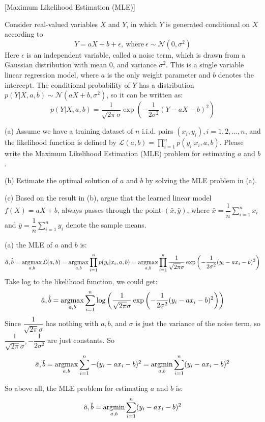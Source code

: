 \item {} [Maximum Likelihood Estimation (MLE)]

Consider real-valued variables $X$ and $Y$, in which $Y$ is generated conditional on $X$ according to
$$Y = aX + b + \epsilon, \ \text{where} \ \epsilon \sim \mathcal{N}(0, \sigma^2)$$
Here $\epsilon$ is an independent variable, called a noise term, which is drawn from a Gaussian distribution with mean 0, and variance $\sigma^2$. This is a single variable linear regression model, where $a$ is the only weight parameter and $b$ denotes the intercept. The conditional probability of $Y$ has a distribution $p(Y | X, a, b) \sim \mathcal{N}(aX+b, \sigma^2)$, so it can be written as:
$$p(Y|X, a,b) = \frac{1}{\sqrt{2\pi}\sigma}\exp\left(-\frac{1}{2\sigma^2}(Y - aX -b)^2\right)$$

(a) Assume we have a training dataset of $n$ i.i.d. pairs $(x_i, y_i), i = 1, 2, \ldots, n$, and the likelihood function is defined by $\mathcal{L}(a,b) = \prod\limits_{i=1}^n p(y_i | x_i, a, b)$. Please write the Maximum Likelihood Estimation (MLE) problem for estimating $a$ and $b$. ~

(b) Estimate the optimal solution of $a$ and $b$ by solving the MLE problem in (a).~

(c) Based on the result in (b), argue that the learned linear model $f(X) = aX + b$, always passes through the point $(\bar{x},\bar{y})$, where $\bar{x} = \dfrac{1}{n}\sum\limits_{i=1}^{n}x_{i}$ and $\bar{y} = \dfrac{1}{n}\sum\limits_{i=1}^{n}y_{i}$ denote the sample means.~

\solution

(a) the MLE of $a$ and $b$ is: \\
$$\hat{a},\hat{b}=\mathop{\rm argmax}\limits_{a,b}\mathcal{L}(a,b)=\mathop{\rm argmax}\limits_{a,b}\prod\limits_{i=1}^np(y_i|x_i,a,b)=\mathop{\rm argmax}\limits_{a,b}\prod\limits_{i=1}^n\dfrac{1}{\sqrt{2\pi}\sigma}\exp\left(-\frac{1}{2\sigma^2}(y_i-ax_i-b)^2\right)$$
Take log to the likelihood function, we could get:
$$\hat{a},\hat{b}=\mathop{\rm argmax}\limits_{a,b}\sum\limits_{i=1}^n\log\left(\frac{1}{\sqrt{2\pi}\sigma}\exp\left(-\frac{1}{2\sigma^2}(y_i-ax_i-b)^2\right)\right)$$
Since $\dfrac{1}{\sqrt{2\pi}\sigma}$ has nothing with $a,b$, and $\sigma$ is just the variance of the noise term, so $\dfrac{1}{\sqrt{2\pi}\sigma}, -\dfrac{1}{2\sigma^2}$ are just constants. So
$$\hat{a},\hat{b}=\mathop{\rm argmax}\limits_{a,b}\sum\limits_{i=1}^n-(y_i-ax_i-b)^2=\mathop{\rm argmin}\limits_{a,b}\sum\limits_{i=1}^n(y_i-ax_i-b)^2$$

So above all, the MLE problem for estimating $a$ and $b$ is:
$$\hat{a},\hat{b}=\mathop{\rm argmin}\limits_{a,b}\sum\limits_{i=1}^n(y_i-ax_i-b)^2$$

